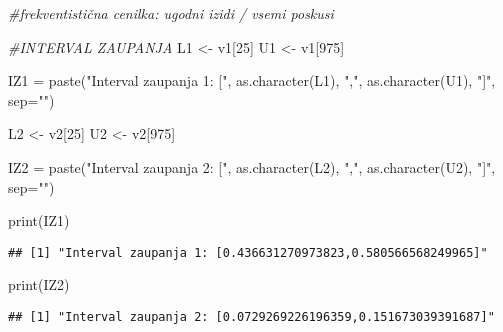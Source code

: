 \documentclass[
]{article}
\newenvironment{Shaded}{\begin{snugshade}}{\end{snugshade}}
\newcommand{\AttributeTok}[1]{\textcolor[rgb]{0.77,0.63,0.00}{#1}}
\newcommand{\CommentTok}[1]{\textcolor[rgb]{0.56,0.35,0.01}{\textit{#1}}}
\newcommand{\DecValTok}[1]{\textcolor[rgb]{0.00,0.00,0.81}{#1}}
\newcommand{\FunctionTok}[1]{\textcolor[rgb]{0.00,0.00,0.00}{#1}}
\newcommand{\NormalTok}[1]{#1}
\newcommand{\OtherTok}[1]{\textcolor[rgb]{0.56,0.35,0.01}{#1}}
\newcommand{\StringTok}[1]{\textcolor[rgb]{0.31,0.60,0.02}{#1}}
\begin{document}
\begin{Shaded}
\begin{Highlighting}[]
\CommentTok{\#frekventistična cenilka: ugodni izidi / vsemi poskusi}


\CommentTok{\#INTERVAL ZAUPANJA}
\NormalTok{L1 }\OtherTok{\textless{}{-}}\NormalTok{ v1[}\DecValTok{25}\NormalTok{]}
\NormalTok{U1 }\OtherTok{\textless{}{-}}\NormalTok{ v1[}\DecValTok{975}\NormalTok{]}

\NormalTok{IZ1 }\OtherTok{=} \FunctionTok{paste}\NormalTok{(}\StringTok{"Interval zaupanja 1: ["}\NormalTok{, }\FunctionTok{as.character}\NormalTok{(L1), }\StringTok{","}\NormalTok{, }\FunctionTok{as.character}\NormalTok{(U1), }\StringTok{"]"}\NormalTok{, }\AttributeTok{sep=}\StringTok{""}\NormalTok{)}
                             


\NormalTok{L2 }\OtherTok{\textless{}{-}}\NormalTok{ v2[}\DecValTok{25}\NormalTok{]}
\NormalTok{U2 }\OtherTok{\textless{}{-}}\NormalTok{ v2[}\DecValTok{975}\NormalTok{]}

\NormalTok{IZ2 }\OtherTok{=} \FunctionTok{paste}\NormalTok{(}\StringTok{"Interval zaupanja 2: ["}\NormalTok{, }\FunctionTok{as.character}\NormalTok{(L2), }\StringTok{","}\NormalTok{, }\FunctionTok{as.character}\NormalTok{(U2), }\StringTok{"]"}\NormalTok{, }\AttributeTok{sep=}\StringTok{""}\NormalTok{)}

\FunctionTok{print}\NormalTok{(IZ1)}
\end{Highlighting}
\end{Shaded}

\begin{verbatim}
## [1] "Interval zaupanja 1: [0.436631270973823,0.580566568249965]"
\end{verbatim}

\begin{Shaded}
\begin{Highlighting}[]
\FunctionTok{print}\NormalTok{(IZ2)}
\end{Highlighting}
\end{Shaded}

\begin{verbatim}
## [1] "Interval zaupanja 2: [0.0729269226196359,0.151673039391687]"
\end{verbatim}
\end{document}
